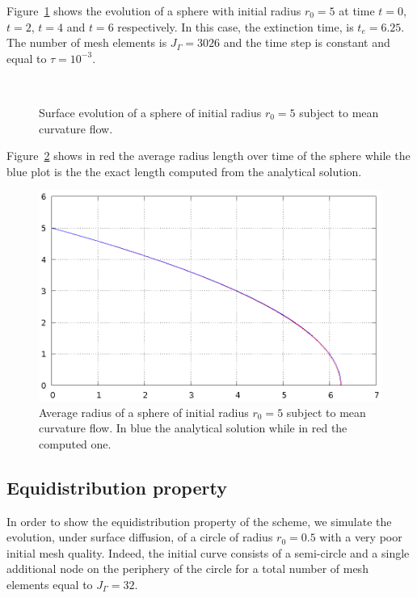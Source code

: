Figure~\ref{fig:mcf_sphere} shows the evolution of a sphere with initial radius
$r_0=5$ at time $t=0$, $t=2$, $t=4$ and $t=6$ respectively. In this case, the
extinction time, is $t_e=6.25$. The number of mesh elements is $J_\Gamma=3026$
and the time step is constant and equal to $\tau=10^{-3}$.

\begin{figure}[htbp]
\centering
{}
\quad
{}
\\
\quad
{}
\caption[Mean curvature flow shrinking sphere]{Surface evolution of a sphere of
initial radius $r_0=5$ subject to mean curvature flow.}
\label{fig:mcf_sphere}
\end{figure}

Figure~\ref{fig:mcf_sphere_radius} shows in red the average radius length
over time of the sphere while the blue plot is the the exact length computed
from the analytical solution.

\begin{figure}[htbp]
\centering
\includegraphics[width=.45\textwidth]
{figures/geometric_pdes/mcf_sphere_radius.ps}
\caption[Mean curvature flow shrinking sphere radius]{Average radius of a
sphere of initial radius $r_0=5$ subject to mean curvature flow. In blue the
analytical solution while in red the computed one.}
\label{fig:mcf_sphere_radius}
\end{figure}

\subsection{Equidistribution property}\label{subsec:sd_circle}
In order to show the equidistribution property of the scheme, we simulate the
evolution, under surface diffusion, of a circle of radius $r_0=0.5$ with a very
poor initial mesh quality. Indeed, the initial curve consists of a semi-circle
and a single additional node on the periphery of the circle for a total number
of mesh elements equal to $J_\Gamma=32$.

